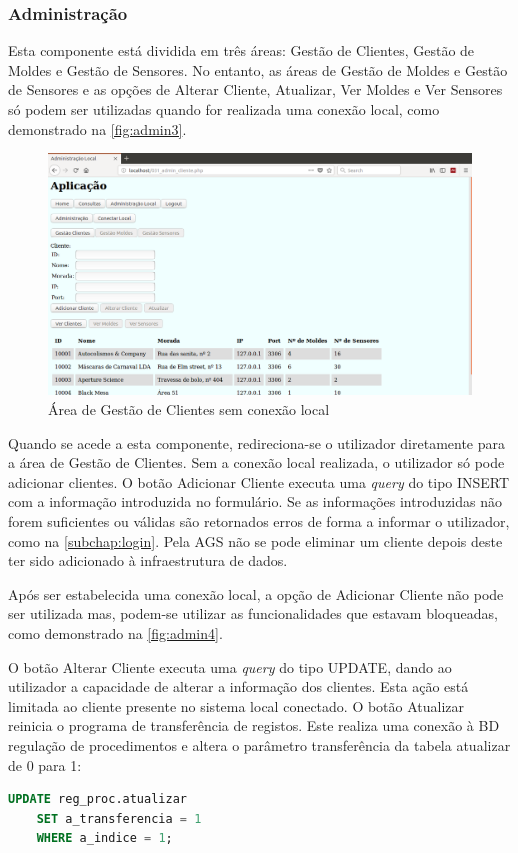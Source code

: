 \documentclass[11pt,twoside,a4paper]{report}
\begin{document}
\subsubsection{Administração}
Esta componente está dividida em três áreas: Gestão de Clientes, Gestão de Moldes e Gestão de Sensores. No entanto, as áreas de Gestão de Moldes e Gestão de Sensores e as opções de Alterar Cliente, Atualizar, Ver Moldes e Ver Sensores só podem ser utilizadas quando for realizada uma conexão local, como demonstrado na \autoref{fig:admin3}.\par
\begin{figure}[H]
	\begin{center}
		\includegraphics[width=1\textwidth]{administracao03} %
		\caption{Área de Gestão de Clientes sem conexão local}
		\label{fig:admin3}
	\end{center}
\end{figure}
Quando se acede a esta componente, redireciona-se o utilizador diretamente para a área de Gestão de Clientes. Sem a conexão local realizada, o utilizador só pode adicionar clientes. O botão Adicionar Cliente executa uma \textit{query} do tipo INSERT com a informação introduzida no formulário. Se as informações introduzidas não forem suficientes ou válidas são retornados erros de forma a informar o utilizador, como na \autoref{subchap:login}. Pela AGS não se pode eliminar um cliente depois deste ter sido adicionado à infraestrutura de dados.\par
Após ser estabelecida uma conexão local, a opção de Adicionar Cliente não pode ser utilizada mas, podem-se utilizar as funcionalidades que estavam bloqueadas, como demonstrado na \autoref{fig:admin4}.\par 
O botão Alterar Cliente executa uma \textit{query} do tipo UPDATE, dando ao utilizador a capacidade de alterar a informação dos clientes. Esta ação está limitada ao cliente presente no sistema local conectado. O botão Atualizar reinicia o programa de transferência de registos. Este realiza uma conexão à BD regulação de procedimentos e altera o parâmetro transferência da tabela atualizar de 0 para 1:
\begin{lstlisting}[language = SQL]
	UPDATE reg_proc.atualizar
	SET a_transferencia = 1
	WHERE a_indice = 1;
\end{lstlisting}
\end{document}
